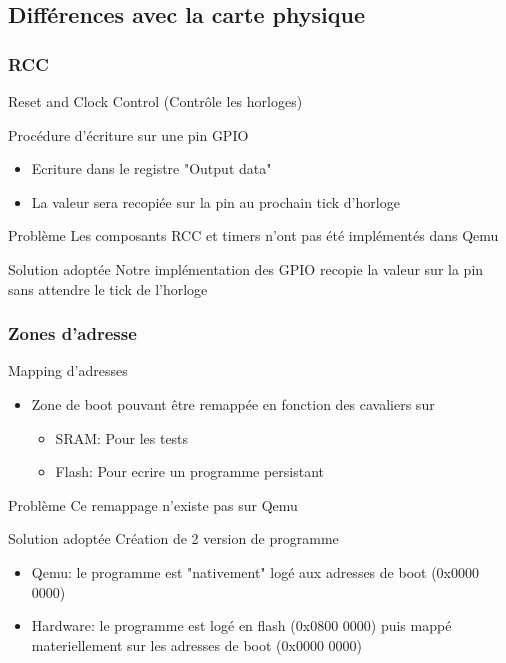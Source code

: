 \documentclass{beamer}
\begin{document}
		
		\subsection{Différences avec la carte physique}
			\begin{frame}
				\frametitle{RCC}
				Reset and Clock Control (Contrôle les horloges)
				\begin{block}{ Procédure d'écriture sur une pin GPIO }
					\begin{itemize}
						\item Ecriture dans le registre "Output data"
						\item La valeur sera recopiée sur la pin au prochain tick d'horloge
					\end{itemize}
				\end{block}
				\begin{alertblock}{ Problème }
					Les composants RCC et timers n'ont pas été implémentés dans Qemu
				\end{alertblock}
				\begin{exampleblock}{ Solution adoptée }
					Notre implémentation des GPIO recopie la valeur sur la pin sans attendre le tick de l'horloge
				\end{exampleblock}
				
			\end{frame}
		
			\begin{frame}
				\frametitle{Zones d'adresse}
				\begin{block}{ Mapping d'adresses }
					\begin{itemize}
						\item Zone de boot pouvant être remappée en fonction des cavaliers sur
							\begin{itemize}
								\item SRAM: Pour les tests
								\item Flash: Pour ecrire un programme persistant
							\end{itemize}
					\end{itemize}
				\end{block}
				\begin{alertblock}{ Problème }
					Ce remappage n'existe pas sur Qemu
				\end{alertblock}
				\begin{exampleblock}{ Solution adoptée }
					Création de 2 version de programme
					\begin{itemize}
						\item Qemu: le programme est "nativement" logé aux adresses de boot (0x0000 0000)
						\item Hardware: le programme est logé en flash (0x0800 0000) puis mappé materiellement sur les adresses de boot (0x0000 0000)
					\end{itemize}
				\end{exampleblock}
			\end{frame}
	
\end{document}
